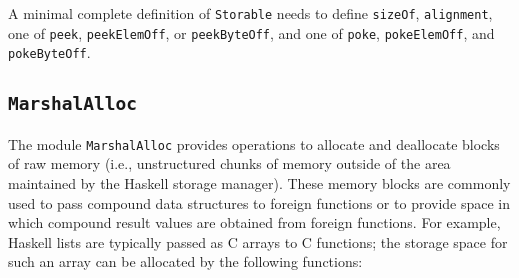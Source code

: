\documentclass[a4paper,twoside]{article}
\newcommand{\code}[1]{\texttt{#1}}      %
\begin{document}
A minimal complete definition of \code{Storable} needs to define
\code{sizeOf}, \code{alignment}, one of \code{peek}, \code{peekElemOff}, or
\code{peekByteOff}, and one of \code{poke}, \code{pokeElemOff}, and
\code{pokeByteOff}.

\subsection{\code{MarshalAlloc}}
\label{sec:MarshalAlloc}

The module \code{MarshalAlloc} provides operations to allocate and deallocate
blocks of raw memory (i.e., unstructured chunks of memory outside of the area
maintained by the Haskell storage manager).  These memory blocks are commonly
used to pass compound data structures to foreign functions or to provide space
in which compound result values are obtained from foreign functions.  For
example, Haskell lists are typically passed as C arrays to C functions; the
storage space for such an array can be allocated by the following functions:
%
\end{document}

